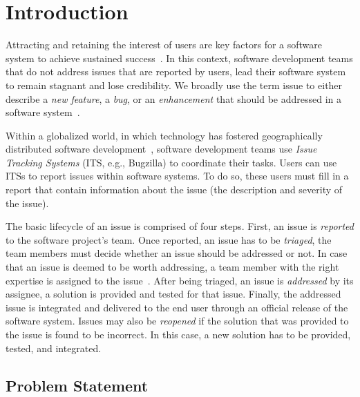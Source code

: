 \chapter[Introduction]{Introduction}

Attracting and retaining the interest of users are key factors for a software
system to achieve sustained
success~\cite{subramaniam2009determinants,delone2003delone}. In this context,
software development teams that do not address issues that are reported by
users, lead their software system to remain stagnant and lose credibility. We
broadly use the term issue to either describe a \textit{new feature}, a
\textit{bug}, or an \textit{enhancement} that should be addressed in a software
system~\cite{giuliano2008}.

Within a globalized world, in which technology has fostered geographically
distributed software development~\cite{herbsleb2003empirical}, software
development teams use \textit{Issue Tracking Systems} (ITS, e.g., Bugzilla) to
coordinate their tasks. Users can use
ITSs to report issues within software systems. To do so, these users must fill
in a report that contain information about the issue (\eg the description and
severity of the issue). 

The basic lifecycle of an issue is comprised of four steps. First, an issue is
{\em reported} to the software project's team. Once reported, an issue has to be
\textit{triaged}, \ie the team members must decide whether an issue should be
addressed or not. In case that an issue is deemed to be worth addressing, a team
member with the right expertise is assigned to the issue~\cite{Anvik2006}. After
being triaged, an issue is \textit{addressed} by its assignee, \ie a solution is
provided and tested for that issue. Finally, the addressed issue is integrated
and delivered to the end user through an official release of the software
system.  Issues may also be \textit{reopened} if the solution that was provided
to the issue is found to be incorrect. In this case, a new solution has to be
provided, tested, and integrated.

\section{Problem Statement} \label{sec:problem}

